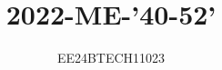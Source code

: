 \documentclass[journal,12pt,onecolumn]{IEEEtran}
\theoremstyle{remark}
\begin{document}

\vspace{3cm}

\title{2022-ME-'40-52'}
\author{EE24BTECH11023}
\maketitle

{\let\newpage\relax\maketitle}

\renewcommand{\thefigure}{\theenumi}
\renewcommand{\thetable}{\theenumi}
\setlength{\intextsep}{10pt} %


\renewcommand{\thetable}{\theenumi}
\end{document}
